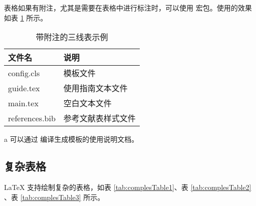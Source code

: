 \documentclass[report,oneside,UTF8,zihao=-4]{config}
\begin{document}
表格如果有附注，尤其是需要在表格中进行标注时，可以使用  宏包。使用的效果如表 \ref{tab:three-line-with-note} 所示。

\begin{table}[H]
    \centering
    \caption{带附注的三线表示例}
    \label{tab:three-line-with-note}
    \renewcommand\arraystretch{1.3} %
    \setlength{\tabcolsep}{20pt} %
    \begin{threeparttable}[c]
        \begin{tabular}{ll}
            \toprule[1.5pt]
            \textbf{文件名}           & \textbf{说明}\\
            \midrule[0.8pt]
            config.cls               & 模板文件\\
            guide.tex\tnote{a}       & 使用指南文本文件\\
            main.tex                 & 空白文本文件\\
            references.bib           & 参考文献表样式文件\\
            \bottomrule[1.5pt]
        \end{tabular}
        \begin{tablenotes}
            \item [a] 可以通过  编译生成模板的使用说明文档。
        \end{tablenotes}
    \end{threeparttable}
\end{table}

\subsection{复杂表格}

\LaTeX{} 支持绘制复杂的表格，如表 \ref{tab:complesTable1}、表 \ref{tab:complesTable2} 、表 \ref{tab:complesTable3} 所示。
\end{document}
